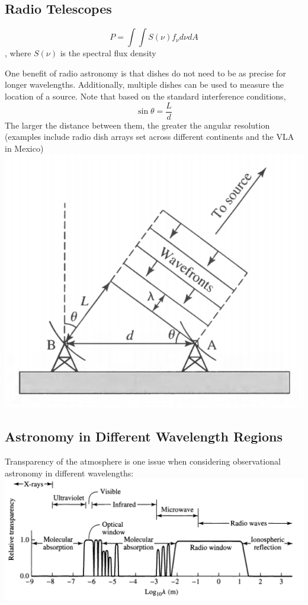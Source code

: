\documentclass[12pt]{article}
\begin{document}
\subsection{Radio Telescopes}
$$P = \int\int S(\nu)f_{\nu}d\nu dA$$, where $S(\nu)$ is the spectral flux density

One benefit of radio astronomy is that dishes do not need to be as precise for longer wavelengths. Additionally, multiple dishes can be used to measure the location of a source. Note that based on the standard interference conditions, $$\sin\theta = \frac{L}{d}$$ The larger the distance between them, the greater the angular resolution (examples include radio dish arrays set across different continents and the VLA in Mexico)\newline
\includegraphics[scale=0.5]{Figures/VLA.png}
\subsection{Astronomy in Different Wavelength Regions}

Transparency of the atmosphere is one issue when considering observational astronomy in different wavelengths:\newline
\includegraphics[scale=0.5]{Figures/WavelengthTransparency.png}
\end{document}
